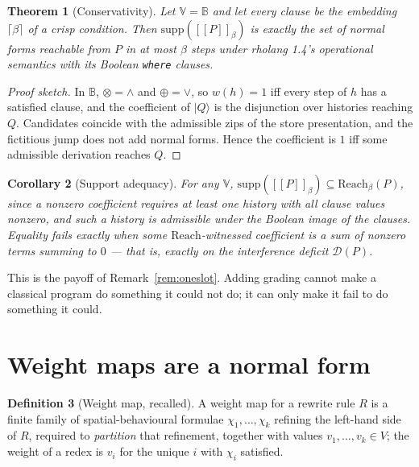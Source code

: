 \documentclass[11pt,a4paper]{article}
\theoremstyle{plain}
\newtheorem{theorem}{Theorem}[section]
\newtheorem{corollary}[theorem]{Corollary}
\theoremstyle{definition}
\newtheorem{definition}[theorem]{Definition}
\theoremstyle{remark}
\newcommand{\sem}[1]{[\![#1]\!]}
\newcommand{\V}{\mathbb{V}}
\newcommand{\Bool}{\mathbb{B}}
\newcommand{\Reach}{\mathrm{Reach}}
\newcommand{\supp}{\mathrm{supp}}
\newcommand{\tensorv}{\otimes}
\newcommand{\sumv}{\oplus}
\newcommand{\crisp}[1]{\lceil #1 \rceil}
\begin{document}
\begin{theorem}[Conservativity]\label{thm:conservativity}
Let $\V = \Bool$ and let every clause be the embedding $\crisp{\beta}$ of a
crisp condition. Then $\supp(\sem{P}_\beta)$ is exactly the set of normal forms
reachable from $P$ in at most $\beta$ steps under rholang 1.4's operational
semantics with its Boolean \texttt{where} clauses.
\end{theorem}

\begin{proof}[Proof sketch]
In $\Bool$, $\tensorv = \wedge$ and $\sumv = \vee$, so $w(h) = 1$ iff every step
of $h$ has a satisfied clause, and the coefficient of $\lvert Q\rangle$ is the
disjunction over histories reaching $Q$. Candidates coincide with the admissible
zips of the store presentation, and the fictitious jump does not add normal
forms. Hence the coefficient is $1$ iff some admissible derivation reaches $Q$.
\end{proof}

\begin{corollary}[Support adequacy]\label{cor:adequacy}
For any $\V$, $\supp(\sem{P}_\beta) \subseteq \Reach_\beta(P)$, since a nonzero
coefficient requires at least one history with all clause values nonzero, and
such a history is admissible under the Boolean image of the clauses. Equality
fails exactly when some $\Reach$-witnessed coefficient is a sum of nonzero terms
summing to $0$ --- that is, exactly on the interference deficit
$\mathcal{D}(P)$.
\end{corollary}

This is the payoff of Remark~\ref{rem:oneslot}. Adding grading cannot make a
classical program do something it could not do; it can only make it fail to do
something it could.

\section{Weight maps are a normal form}\label{sec:weightmaps}

\begin{definition}[Weight map, recalled]\label{def:wmap}
A weight map for a rewrite rule $R$ is a finite family of spatial-behavioural
formulae $\chi_1,\dots,\chi_k$ refining the left-hand side of $R$, required to
\emph{partition} that refinement, together with values $v_1,\dots,v_k \in V$;
the weight of a redex is $v_i$ for the unique $i$ with $\chi_i$ satisfied.
\end{definition}
\end{document}
